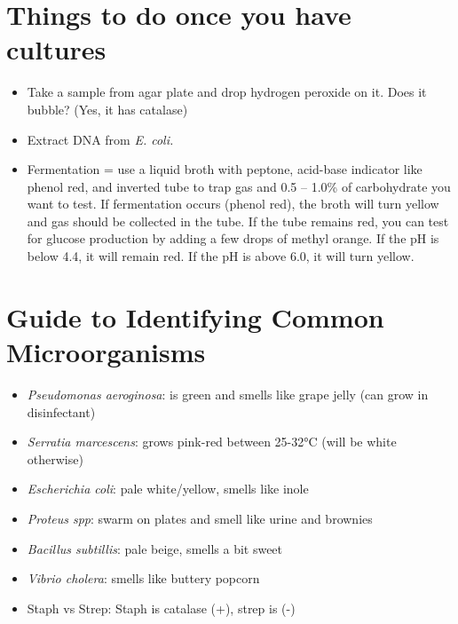 \section{Things to do once you have cultures}

\begin{itemize}

\item{Take a sample from agar plate and drop hydrogen peroxide on it. Does it bubble? (Yes, it has catalase)}

\item{Extract DNA from \textit{E. coli.}}

\item{Fermentation = use a liquid broth with peptone, acid-base indicator like phenol red, and inverted tube to trap gas and 0.5 – 1.0\% of carbohydrate you want to test. If fermentation occurs (phenol red), the broth will turn yellow and gas should be collected in the tube. If the tube remains red, you can test for glucose production by adding a few drops of methyl orange. If the pH is below 4.4, it will remain red. If the pH is above 6.0, it will turn yellow.}

\end{itemize}

\section{Guide to Identifying Common Microorganisms}

\begin{itemize}

\item{\textit{Pseudomonas aeroginosa}: is green and smells like grape jelly (can grow in disinfectant)}

\item{\textit{Serratia marcescens}: grows pink-red between 25-32°C (will be white otherwise)}

\item{\textit{Escherichia coli}: pale white/yellow, smells like inole}

\item{\textit{Proteus spp}: swarm on plates and smell like urine and brownies}

\item{\textit{Bacillus subtillis}: pale beige, smells a bit sweet}

\item{\textit{Vibrio cholera}: smells like buttery popcorn}

\item{Staph vs Strep: Staph is catalase (+), strep is (-)}

\end{itemize}
